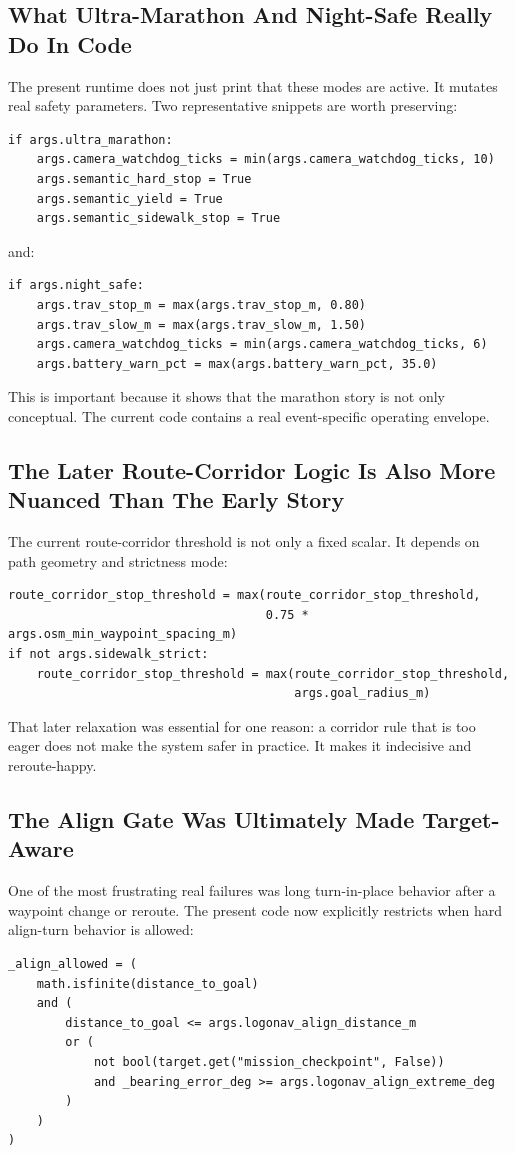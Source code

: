 \documentclass[11pt]{article}
\begin{document}
\subsection{What Ultra-Marathon And Night-Safe Really Do In Code}
The present runtime does not just print that these modes are active. It mutates real safety parameters. Two representative snippets are worth preserving:
\begin{verbatim}
if args.ultra_marathon:
    args.camera_watchdog_ticks = min(args.camera_watchdog_ticks, 10)
    args.semantic_hard_stop = True
    args.semantic_yield = True
    args.semantic_sidewalk_stop = True
\end{verbatim}

and:
\begin{verbatim}
if args.night_safe:
    args.trav_stop_m = max(args.trav_stop_m, 0.80)
    args.trav_slow_m = max(args.trav_slow_m, 1.50)
    args.camera_watchdog_ticks = min(args.camera_watchdog_ticks, 6)
    args.battery_warn_pct = max(args.battery_warn_pct, 35.0)
\end{verbatim}

This is important because it shows that the marathon story is not only conceptual. The current code contains a real event-specific operating envelope.

\subsection{The Later Route-Corridor Logic Is Also More Nuanced Than The Early Story}
The current route-corridor threshold is not only a fixed scalar. It depends on path geometry and strictness mode:
\begin{verbatim}
route_corridor_stop_threshold = max(route_corridor_stop_threshold,
                                    0.75 * args.osm_min_waypoint_spacing_m)
if not args.sidewalk_strict:
    route_corridor_stop_threshold = max(route_corridor_stop_threshold,
                                        args.goal_radius_m)
\end{verbatim}

That later relaxation was essential for one reason: a corridor rule that is too eager does not make the system safer in practice. It makes it indecisive and reroute-happy.

\subsection{The Align Gate Was Ultimately Made Target-Aware}
One of the most frustrating real failures was long turn-in-place behavior after a waypoint change or reroute. The present code now explicitly restricts when hard align-turn behavior is allowed:
\begin{verbatim}
_align_allowed = (
    math.isfinite(distance_to_goal)
    and (
        distance_to_goal <= args.logonav_align_distance_m
        or (
            not bool(target.get("mission_checkpoint", False))
            and _bearing_error_deg >= args.logonav_align_extreme_deg
        )
    )
)
\end{verbatim}
\end{document}
